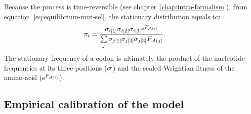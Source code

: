 Because the process is time-reversible (see chapter~\ref{chap:intro-formalism}), from equation~\ref{eq:equilibrium-mut-sel}, the stationary distribution equals to:
\begin{align}
    \pi_{{i}} & = \dfrac{\sigma_{{i}[1]}\sigma_{{i}[2]}\sigma_{{i}[3]}\text{e}^{F_{\mathcal{A}({i})}}}{\sum\limits_{{j}}\sigma_{{j}[1]}\sigma_{{j}[2]}\sigma_{{j}[3]}F_{\mathcal{A}({j})} }.
\end{align}
The stationary frequency of a codon is ultimately the product of the nucleotide frequencies at its three positions ($\bm{\sigma}$) and the scaled Wrightian fitness of the amino-acid ($\text{e}^{F_{\mathcal{A}({i})}}$).

\subsection{Empirical calibration of the model}
\label{subsec:empirical-calibration-HB}

